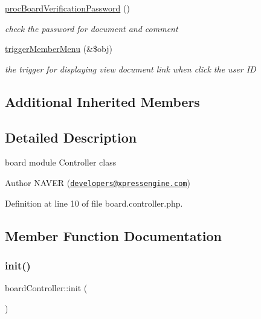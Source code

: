\begin{DoxyCompactItemize}
\hyperlink{classboardController_a0e52095fdfe92ab0533ac33e329e31c6}{proc\+Board\+Verification\+Password} ()
\begin{DoxyCompactList}\small\item\em check the password for document and comment \end{DoxyCompactList}\item 
\hyperlink{classboardController_a1f462e1fe4adab5463f527be6f0dd2b9}{trigger\+Member\+Menu} (\&\$obj)
\begin{DoxyCompactList}\small\item\em the trigger for displaying \textquotesingle{}view document\textquotesingle{} link when click the user ID \end{DoxyCompactList}\end{DoxyCompactItemize}
\subsection*{Additional Inherited Members}


\subsection{Detailed Description}
board module Controller class 

\begin{DoxyAuthor}{Author}
N\+A\+V\+ER (\href{mailto:developers@xpressengine.com}{\tt developers@xpressengine.\+com}) 
\end{DoxyAuthor}


Definition at line 10 of file board.\+controller.\+php.



\subsection{Member Function Documentation}
\hypertarget{classboardController_a1e9dcbf2879520adc6c5ce9b68361408}{}\label{classboardController_a1e9dcbf2879520adc6c5ce9b68361408} 
\subsubsection{\texorpdfstring{init()}{init()}}
{\footnotesize\ttfamily board\+Controller\+::init (\begin{DoxyParamCaption}{ }\end{DoxyParamCaption})}



